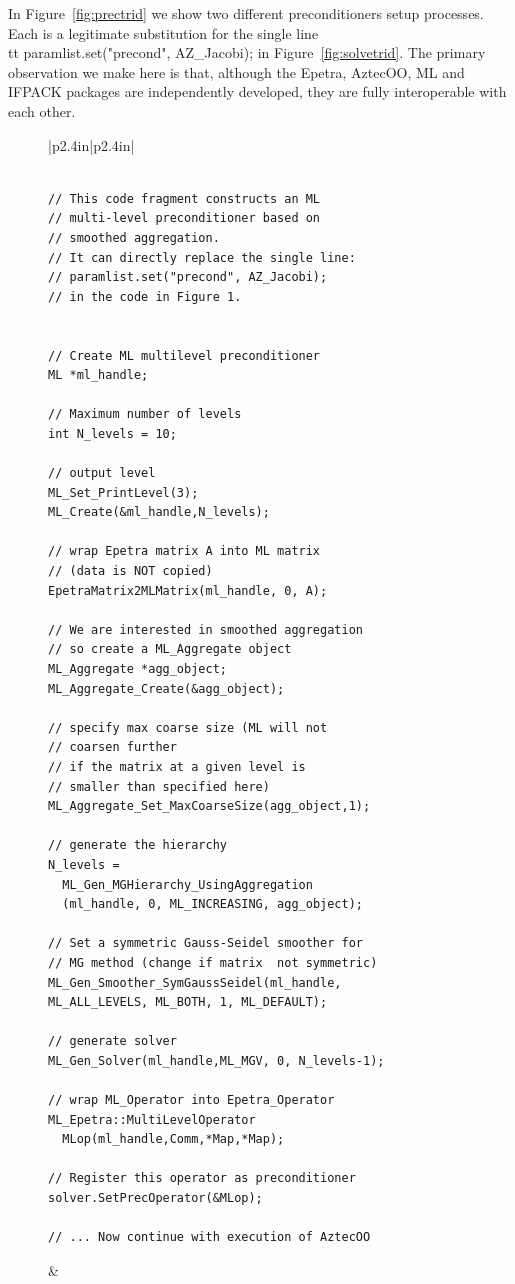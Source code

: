 \documentclass[acmtoms,acmnow]{acmtrans2m}
\begin{document}
In Figure~\ref{fig:prectrid} we show two different preconditioners
setup processes.  Each is a legitimate substitution for the single
line {\\tt paramlist.set("precond", AZ\_Jacobi);} in
Figure~\ref{fig:solvetrid}.  The primary observation we make here is
that, although the Epetra, AztecOO, ML and IFPACK packages are
independently developed, they are fully interoperable with each other.
\begin{figure}
{\scriptsize
\begin{tabular}{|p{2.4in}|p{2.4in}|}\hline
\begin{verbatim}

// This code fragment constructs an ML
// multi-level preconditioner based on 
// smoothed aggregation.
// It can directly replace the single line:
// paramlist.set("precond", AZ_Jacobi);
// in the code in Figure 1.


// Create ML multilevel preconditioner
ML *ml_handle;

// Maximum number of levels 
int N_levels = 10;

// output level
ML_Set_PrintLevel(3);
ML_Create(&ml_handle,N_levels);

// wrap Epetra matrix A into ML matrix 
// (data is NOT copied)
EpetraMatrix2MLMatrix(ml_handle, 0, A);

// We are interested in smoothed aggregation
// so create a ML_Aggregate object
ML_Aggregate *agg_object;
ML_Aggregate_Create(&agg_object);

// specify max coarse size (ML will not 
// coarsen further 
// if the matrix at a given level is
// smaller than specified here)
ML_Aggregate_Set_MaxCoarseSize(agg_object,1);

// generate the hierarchy
N_levels = 
  ML_Gen_MGHierarchy_UsingAggregation
  (ml_handle, 0, ML_INCREASING, agg_object);

// Set a symmetric Gauss-Seidel smoother for 
// MG method (change if matrix  not symmetric)
ML_Gen_Smoother_SymGaussSeidel(ml_handle, 
ML_ALL_LEVELS, ML_BOTH, 1, ML_DEFAULT);

// generate solver
ML_Gen_Solver(ml_handle,ML_MGV, 0, N_levels-1);

// wrap ML_Operator into Epetra_Operator
ML_Epetra::MultiLevelOperator  
  MLop(ml_handle,Comm,*Map,*Map);

// Register this operator as preconditioner
solver.SetPrecOperator(&MLop);

// ... Now continue with execution of AztecOO
\end{verbatim}
&
\begin{verbatim}


\end{verbatim}
\end{tabular}}
\end{figure}
\end{document}
